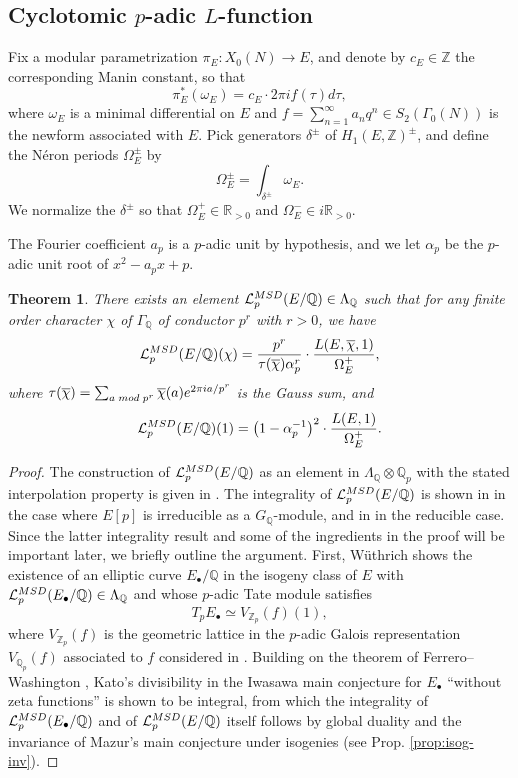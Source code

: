 \documentclass[a4paper,10pt]{amsart}
\numberwithin{equation}{section}
\numberwithin{equation}{section}
\theoremstyle{plain}
\newtheorem{thm}{Theorem}[subsection] %
\theoremstyle{definition}
\theoremstyle{definition}
\theoremstyle{plain}
\theoremstyle{plain}
\theoremstyle{plain}
\theoremstyle{plain}
\newcommand{\Z}{\mathbb{Z}}
\newcommand{\Q}{\mathbb{Q}}
\newcommand{\R}{\mathbb{R}}
\newcommand{\Lcal}{\mathcal{L}}
\begin{document}
\subsection{Cyclotomic $p$-adic $L$-function}
\label{subsec:L-cyc} 

Fix a modular parametrization $\pi_E:X_0(N)\rightarrow E$, and denote by $c_E\in\Z$ the corresponding Manin constant, so that 
\[
\pi_E^*(\omega_E)=c_E\cdot 2\pi i f(\tau)d\tau,
\] 
where $\omega_E$ is a minimal differential on $E$ and $f=\sum_{n=1}^\infty a_nq^n\in S_2(\Gamma_0(N))$ is the  newform associated with $E$.  Pick generators $\delta^\pm$ of $H_1(E,\Z)^\pm$, and define the N\'{e}ron periods $\Omega_E^\pm$ by 
\[
\Omega_E^\pm=\int_{\delta^\pm}\omega_E.
\]
We normalize the $\delta^\pm$
so that $\Omega_E^+\in\R_{>0}$ and $\Omega_E^-\in i\R_{>0}$.

The Fourier coefficient $a_p$ is a $p$-adic unit by hypothesis, and we let $\alpha_p$ be the $p$-adic unit root of $x^2-a_px+p$. 

\begin{thm}
\label{thm:MSD}
There exists an element $\Lcal^{\rm MSD}_p(E/\Q)\in\Lambda_\Q$ such that for any finite order character $\chi$ of $\Gamma_\Q$ of conductor $p^r$ with $r>0$, we have
\[
\Lcal^{\rm MSD}_p(E/\Q)(\chi)=\frac{p^r}{\tau(\overline{\chi})\alpha_p^r}\cdot\frac{L(E,\overline{\chi},1)}{\Omega_E^+},
\]
where $\tau(\overline{\chi})=\sum_{a\;{\rm mod}\;p^r}\overline{\chi}(a)e^{2\pi ia/p^r}$ is the Gauss sum, and
\[
\Lcal_p^{\rm MSD}(E/\Q)(1)=\bigl(1-\alpha_p^{-1}\bigr)^2\cdot\frac{ L(E,1)}{\Omega_E^+}.
\]
\end{thm}

\begin{proof}
The construction of $\Lcal_p^{\rm MSD}(E/\Q)$ as an element in $\Lambda_{\Q}\otimes\Q_p$ with the stated interpolation property is given in \cite[\S{9}]{M-SwD}. 
The integrality of $\Lcal_p^{\rm MSD}(E/\Q)$ is shown in \cite[Prop.~3.7]{greenvats} in the case where $E[p]$ is irreducible as a $G_\Q$-module, and in \cite[Cor.~18]{wuthrich-int} in the reducible case. Since the latter integrality result and some of the ingredients in the proof will be important later, we briefly outline the argument. First, W\"uthrich shows the existence of an elliptic curve $E_\bullet/\Q$ in the isogeny class of $E$ with $\mathcal{L}_p^{\rm MSD}(E_\bullet/\Q)\in\Lambda_{\Q}$ and whose $p$-adic Tate module satisfies 
\[
T_pE_{\bullet}\simeq V_{\Z_p}(f)(1),
\] 
where $V_{\Z_p}(f)$ is the geometric lattice in the $p$-adic Galois representation $V_{\Q_p}(f)$ associated to $f$ considered in \cite[\S{8.3}]{kato-euler-systems}. Building on the theorem of Ferrero--Washington \cite{FW}, Kato's divisibility in the Iwasawa main conjecture for $E_\bullet$ ``without zeta functions''  \cite[Thm.~12.5(4)]{kato-euler-systems} is shown to be integral, from which the integrality of $\mathcal{L}_p^{\rm MSD}(E_\bullet/\Q)$ and of $\mathcal{L}_p^{\rm MSD}(E/\Q)$ itself follows by global duality and the invariance of Mazur's main conjecture under isogenies (see Prop. \ref{prop:isog-inv}).
\end{proof}
\end{document}
